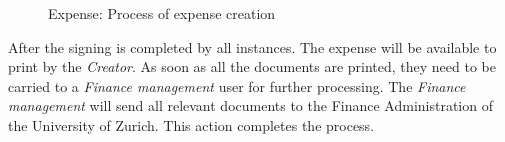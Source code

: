 \begin{figure}[H]
    \centering
    \caption{Expense: Process of expense creation}
    \label{fig:expense-process}
\end{figure}

After the signing is completed by all instances. The expense will be available to print by the \textit{Creator}. As soon as all the documents are printed, they need to be carried to a \textit{Finance management} user for further processing. The \textit{Finance management} will send all relevant documents to the Finance Administration of the University of Zurich. This action completes the process.
